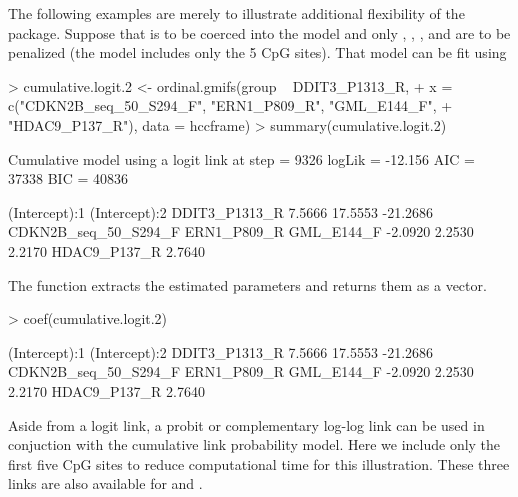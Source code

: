 \documentclass[article, shortclass, nojss]{jss}
\begin{document}
The following examples are merely to illustrate additional flexibility of the package. Suppose that  is to be coerced into the model and only , , , and  are to be penalized (the model includes only the 5 CpG sites). That model can be fit using
\begin{Schunk}
\begin{Sinput}
> cumulative.logit.2 <- ordinal.gmifs(group ~ DDIT3_P1313_R, 
+      x = c("CDKN2B_seq_50_S294_F", "ERN1_P809_R", "GML_E144_F",
+      	    "HDAC9_P137_R"),  data = hccframe)
> summary(cumulative.logit.2)
\end{Sinput}
\begin{Soutput}
Cumulative model using a  logit  link 
at step    =  9326 
logLik     =  -12.156 
AIC        =  37338 
BIC        =  40836 

       (Intercept):1        (Intercept):2        DDIT3_P1313_R 
              7.5666              17.5553             -21.2686 
CDKN2B_seq_50_S294_F          ERN1_P809_R           GML_E144_F 
             -2.0920               2.2530               2.2170 
        HDAC9_P137_R 
              2.7640 
\end{Soutput}
\end{Schunk}
The  function extracts the estimated parameters and returns them as a vector. 
\begin{Schunk}
\begin{Sinput}
> coef(cumulative.logit.2)
\end{Sinput}
\begin{Soutput}
       (Intercept):1        (Intercept):2        DDIT3_P1313_R 
              7.5666              17.5553             -21.2686 
CDKN2B_seq_50_S294_F          ERN1_P809_R           GML_E144_F 
             -2.0920               2.2530               2.2170 
        HDAC9_P137_R 
              2.7640 
\end{Soutput}
\end{Schunk}
Aside from a logit link, a probit or complementary log-log link can be used in conjuction with the cumulative link probability model. Here we include only the first five CpG sites to reduce computational time for this illustration. These three links are also available for  and \newline
{}.
\end{document}
